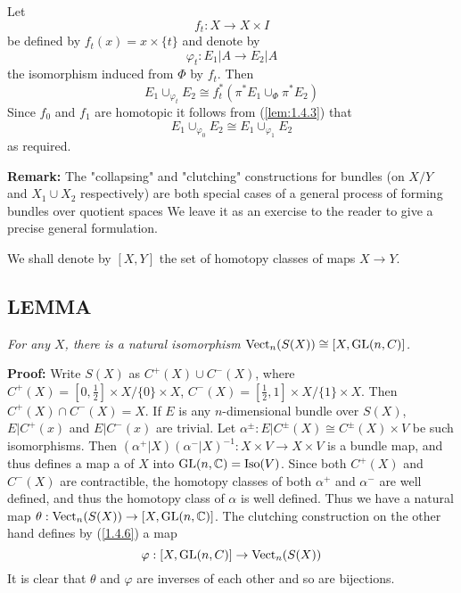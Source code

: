 Let 
\begin{equation*}
    f_t: X \to X \times I
\end{equation*}
be defined by $f_t(x) = x \times \{t\}$ and denote by
\begin{equation*}
    \varphi_t: E_1 \vert A \to E_2 \vert A
\end{equation*}
the isomorphism induced from $\Phi$ by $f_t$. Then
\begin{equation*}
    E_1 \cup_{\varphi_t} E_2 \cong f_t^*(\pi^* E_1 \cup_\Phi \pi^* E_2)
\end{equation*}
Since $f_0$ and $f_1$ are homotopic it follows from (\ref{lem:1.4.3}) that
\begin{equation*}
    E_1 \cup_{\varphi_0} E_2 \cong E_1 \cup_{\varphi_1} E_2
\end{equation*}
as required. \par 

\textbf{Remark:} The "collapsing" and "clutching" constructions for bundles (on $X/Y$ and $X_1 \cup X_2$ respectively) are both special cases of a general process of forming bundles over quotient spaces We leave it as an exercise to the reader to give a precise general formulation. \par 

We shall denote by $[X, Y]$ the set of homotopy classes of maps $X \to Y$. \par 

\subsection{LEMMA}\label{lem:1.4.9} \textit{For any $X$, there is a natural isomorphism $\operatorname{Vect}_n(S(X)) \cong [X, \operatorname{GL}(n, C)]$.} \par 

\textbf{Proof:} Write $S(X)$ as $C^+(X) \cup C^-(X)$, where $C^+(X) = [0, \frac{1}{2}] \times X/\{0\} \times X$, $C^-(X) = [\frac{1}{2}, 1] \times X/\{1\} \times X$. Then $C^+(X) \cap C^-(X) = X$. If $E$ is any $n$-dimensional bundle over $S(X)$, $E \vert C^+(x)$ and $E \vert C^-(x)$ are trivial. Let $\alpha^\pm: E \vert C^\pm(X) \cong C^\pm(X) \times V$ be such isomorphisms. Then $(\alpha^+ \vert X)(\alpha^- \vert X)^{-1}: X \times V \to X \times V$ is a bundle map, and thus defines a map a of $X$ into $\operatorname{GL}(n, \mathbb{C}) = \operatorname{Iso}(V)$. Since both $C^+(X)$ and $C^-(X)$ are contractible, the homotopy classes of both $\alpha^+$ and $\alpha^-$ are well defined, and thus the homotopy class of $\alpha$ is well defined. Thus we have a natural map $\theta: \operatorname{Vect}_n(S(X)) \to [X, \operatorname{GL}(n, \mathbb{C})]$. The clutching construction on the other hand defines by (\ref{1.4.6}) a map
\begin{equation*}
    \varphi: [X, \operatorname{GL}(n, C)] \to \operatorname{Vect}_n(S(X))
\end{equation*}
It is clear that $\theta$ and $\varphi$ are inverses of each other and so are bijections. \par 

